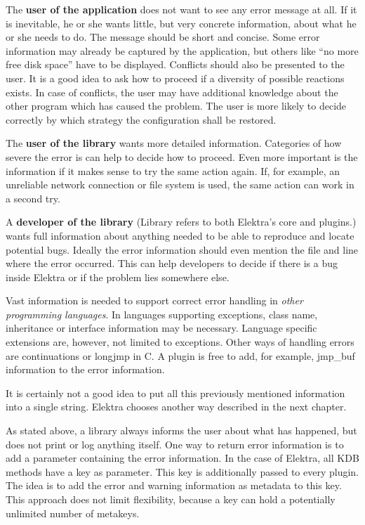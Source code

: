 \begin{DoxyItemize}
\item The {\bfseries{user of the application}} does not want to see any error message at all. If it is inevitable, he or she wants little, but very concrete information, about what he or she needs to do. The message should be short and concise. Some error information may already be captured by the application, but others like “no more free disk space” have to be displayed. Conflicts should also be presented to the user. It is a good idea to ask how to proceed if a diversity of possible reactions exists. In case of conflicts, the user may have additional knowledge about the other program which has caused the problem. The user is more likely to decide correctly by which strategy the configuration shall be restored.
\item The {\bfseries{user of the library}} wants more detailed information. Categories of how severe the error is can help to decide how to proceed. Even more important is the information if it makes sense to try the same action again. If, for example, an unreliable network connection or file system is used, the same action can work in a second try.
\item A {\bfseries{developer of the library}} (Library refers to both Elektra’s core and plugins.) wants full information about anything needed to be able to reproduce and locate potential bugs. Ideally the error information should even mention the file and line where the error occurred. This can help developers to decide if there is a bug inside Elektra or if the problem lies somewhere else.
\item Vast information is needed to support correct error handling in {\itshape other programming languages}. In languages supporting exceptions, class name, inheritance or interface information may be necessary. Language specific extensions are, however, not limited to exceptions. Other ways of handling errors are continuations or {\ttfamily longjmp} in C. A plugin is free to add, for example, {\ttfamily jmp\+\_\+buf} information to the error information.
\end{DoxyItemize}

It is certainly not a good idea to put all this previously mentioned information into a single string. Elektra chooses another way described in the next chapter.

As stated above, a library always informs the user about what has happened, but does not print or log anything itself. One way to return error information is to add a parameter containing the error information. In the case of Elektra, all {\ttfamily K\+DB} methods have a key as parameter. This key is additionally passed to every plugin. The idea is to add the error and warning information as metadata to this key. This approach does not limit flexibility, because a key can hold a potentially unlimited number of metakeys.

